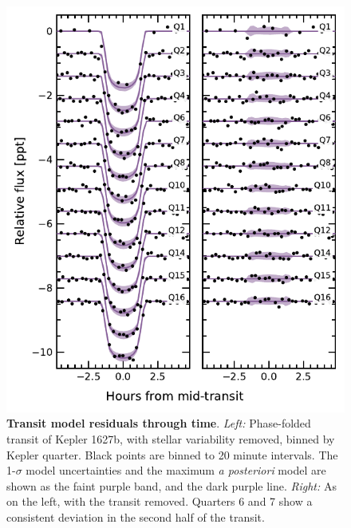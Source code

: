 \documentclass[12pt,modern,twocolumn,tighten]{aastex63}
\begin{document}
\begin{figure}[t]
	\begin{center}
		\leavevmode
		\includegraphics[width=1\textwidth]{f9.pdf}
	\end{center}
	\vspace{-0.7cm}
	\caption{
		{\bf Transit model residuals through time}.  
    {\it Left:}
		Phase-folded transit of Kepler 1627b, with stellar
    variability removed, binned by Kepler quarter.
    Black points are binned to 20 minute intervals.
    The 1-$\sigma$ model uncertainties and the maximum {\it a
    posteriori} model are shown as the faint purple band, and the dark
    purple line.
    {\it Right:}
    As on the left, with the transit removed.
    Quarters 6 and 7 show a consistent deviation in the second half of
    the transit.
		\label{fig:phasequarter}
	}
\end{figure}
\end{document}
